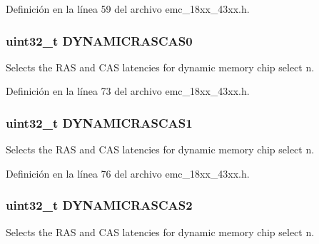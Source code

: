 Definición en la línea 59 del archivo emc\+\_\+18xx\+\_\+43xx.\+h.

\subsubsection[{\texorpdfstring{D\+Y\+N\+A\+M\+I\+C\+R\+A\+S\+C\+A\+S0}{DYNAMICRASCAS0}}]{ uint32\+\_\+t D\+Y\+N\+A\+M\+I\+C\+R\+A\+S\+C\+A\+S0}\hypertarget{struct_l_p_c___e_m_c___t_a4fd29f97b0c8655e264629fd79ce241f}{}\label{struct_l_p_c___e_m_c___t_a4fd29f97b0c8655e264629fd79ce241f}
Selects the R\+AS and C\+AS latencies for dynamic memory chip select n. 

Definición en la línea 73 del archivo emc\+\_\+18xx\+\_\+43xx.\+h.

\subsubsection[{\texorpdfstring{D\+Y\+N\+A\+M\+I\+C\+R\+A\+S\+C\+A\+S1}{DYNAMICRASCAS1}}]{ uint32\+\_\+t D\+Y\+N\+A\+M\+I\+C\+R\+A\+S\+C\+A\+S1}\hypertarget{struct_l_p_c___e_m_c___t_ab3c5861c837ea74c5519328c717d248d}{}\label{struct_l_p_c___e_m_c___t_ab3c5861c837ea74c5519328c717d248d}
Selects the R\+AS and C\+AS latencies for dynamic memory chip select n. 

Definición en la línea 76 del archivo emc\+\_\+18xx\+\_\+43xx.\+h.

\subsubsection[{\texorpdfstring{D\+Y\+N\+A\+M\+I\+C\+R\+A\+S\+C\+A\+S2}{DYNAMICRASCAS2}}]{ uint32\+\_\+t D\+Y\+N\+A\+M\+I\+C\+R\+A\+S\+C\+A\+S2}\hypertarget{struct_l_p_c___e_m_c___t_a81b7a33f95c7e483ff5e0306a3790bcb}{}\label{struct_l_p_c___e_m_c___t_a81b7a33f95c7e483ff5e0306a3790bcb}
Selects the R\+AS and C\+AS latencies for dynamic memory chip select n. 

